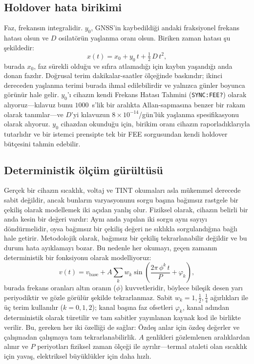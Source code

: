 \documentclass[9pt,twocolumn,a4paper]{extarticle}
\begin{document}
\subsection{Holdover hata birikimi}
Faz, frekansın integralidir. $y_0$, GNSS'in kaybedildiği andaki fraksiyonel frekans hatası olsun ve $D$ osilatörün yaşlanma oranı olsun. Biriken zaman hatası şu şekildedir:
\begin{equation}
x(t) = x_0 + y_0\,t + \tfrac{1}{2}\,D\,t^{2},
\label{eq:holdover}
\end{equation}
burada $x_0$, faz sürekli olduğu ve sıfıra atlamadığı için kaybın yaşandığı anda donan fazdır. Doğrusal terim dakikalar-saatler ölçeğinde baskındır; ikinci dereceden yaşlanma terimi burada ihmal edilebilirdir ve yalnızca günler boyunca görünür hale gelir. $y_0$'ı cihazın kendi Frekans Hatası Tahmini (\texttt{SYNC:FEE?}) olarak alıyoruz---kılavuz bunu $1000$~s'lik bir aralıkta Allan-sapmasına benzer bir rakam olarak tanımlar---ve $D$'yi kılavuzun $8\times10^{-14}$/gün'lük yaşlanma spesifikasyonu olarak alıyoruz. $y_0$ cihazdan okunduğu için, birikim oranı cihazın raporladıklarıyla tutarlıdır ve bir istemci prensipte tek bir FEE sorgusundan kendi holdover bütçesini tahmin edebilir.

\subsection{Deterministik ölçüm gürültüsü}
Gerçek bir cihazın sıcaklık, voltaj ve TINT okumaları asla mükemmel derecede sabit değildir, ancak bunların varyasyonunu sorgu başına bağımsız rastgele bir çekiliş olarak modellemek iki açıdan yanlış olur. Fiziksel olarak, cihazın belirli bir anda kesin bir değeri vardır: Aynı anda yapılan iki sorgu aynı sayıyı döndürmelidir, oysa bağımsız bir çekiliş değeri ne sıklıkla sorgulandığına bağlı hale getirir. Metodolojik olarak, bağımsız bir çekiliş tekrarlanabilir değildir ve bu durum hata ayıklamayı bozar. Bu nedenle her okumayı, geçen zamanın deterministik bir fonksiyonu olarak modelliyoruz:
\begin{equation}
v(t) = v_{\mathrm{base}} + A \sum_{k} w_k
       \sin\!\left(\frac{2\pi\,\phi^{k}\,t}{P} + \varphi_k\right),
\label{eq:noise}
\end{equation}
burada frekans oranları altın oranın ($\phi$) kuvvetleridir, böylece bileşik desen yarı periyodiktir ve gözle görülür şekilde tekrarlanmaz. Sabit $w_k=1,\tfrac12,\tfrac14$ ağırlıkları ile üç terim kullanılır ($k=0,1,2$); kanal başına faz ofsetleri $\varphi_k$, kanal adından deterministik olarak türetilir ve tam sabitler yayınlanan kaynak kod ile birlikte verilir. Bu, gereken her iki özelliği de sağlar: Özdeş anlar için özdeş değerler ve çalışmadan çalışmaya tam tekrarlanabilirlik. $A$ genlikleri gözlemlenen aralıklardan alınır ve $P$ periyotları fiziksel zaman ölçeği ile ayrılır---termal ataleti olan sıcaklık için yavaş, elektriksel büyüklükler için daha hızlı.
\end{document}
